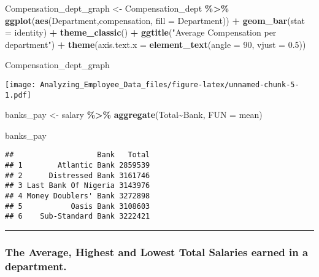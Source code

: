 \documentclass[
]{article}
\newenvironment{Shaded}{\begin{snugshade}}{\end{snugshade}}
\newcommand{\AttributeTok}[1]{\textcolor[rgb]{0.13,0.29,0.53}{#1}}
\newcommand{\DecValTok}[1]{\textcolor[rgb]{0.00,0.00,0.81}{#1}}
\newcommand{\FloatTok}[1]{\textcolor[rgb]{0.00,0.00,0.81}{#1}}
\newcommand{\FunctionTok}[1]{\textcolor[rgb]{0.13,0.29,0.53}{\textbf{#1}}}
\newcommand{\NormalTok}[1]{#1}
\newcommand{\OtherTok}[1]{\textcolor[rgb]{0.56,0.35,0.01}{#1}}
\newcommand{\SpecialCharTok}[1]{\textcolor[rgb]{0.81,0.36,0.00}{\textbf{#1}}}
\newcommand{\StringTok}[1]{\textcolor[rgb]{0.31,0.60,0.02}{#1}}
\begin{document}
\begin{Shaded}
\begin{Highlighting}[]
\NormalTok{Compensation\_dept\_graph }\OtherTok{\textless{}{-}}\NormalTok{ Compensation\_dept }\SpecialCharTok{\%\textgreater{}\%} \FunctionTok{ggplot}\NormalTok{(}\FunctionTok{aes}\NormalTok{(Department,compensation, }\AttributeTok{fill =}\NormalTok{ Department)) }\SpecialCharTok{+} \FunctionTok{geom\_bar}\NormalTok{(}\AttributeTok{stat =} \StringTok{\textquotesingle{}identity\textquotesingle{}}\NormalTok{)  }\SpecialCharTok{+} 
  \FunctionTok{theme\_classic}\NormalTok{() }\SpecialCharTok{+}  \FunctionTok{ggtitle}\NormalTok{(}\StringTok{"Average Compensation per department"}\NormalTok{) }\SpecialCharTok{+} \FunctionTok{theme}\NormalTok{(}\AttributeTok{axis.text.x =} \FunctionTok{element\_text}\NormalTok{(}\AttributeTok{angle =} \DecValTok{90}\NormalTok{, }\AttributeTok{vjust =} \FloatTok{0.5}\NormalTok{))}



\NormalTok{Compensation\_dept\_graph}
\end{Highlighting}
\end{Shaded}

\texttt{[image: Analyzing\_Employee\_Data\_files/figure-latex/unnamed-chunk-5-1.pdf]}

\begin{Shaded}
\begin{Highlighting}[]
\NormalTok{banks\_pay }\OtherTok{\textless{}{-}}\NormalTok{ salary }\SpecialCharTok{\%\textgreater{}\%} 
  \FunctionTok{aggregate}\NormalTok{(Total}\SpecialCharTok{\textasciitilde{}}\NormalTok{Bank,}
            \AttributeTok{FUN =} \StringTok{\textquotesingle{}mean\textquotesingle{}}\NormalTok{)}

\NormalTok{banks\_pay}
\end{Highlighting}
\end{Shaded}

\begin{verbatim}
##                   Bank   Total
## 1        Atlantic Bank 2859539
## 2      Distressed Bank 3161746
## 3 Last Bank Of Nigeria 3143976
## 4 Money Doublers' Bank 3272898
## 5           Oasis Bank 3108603
## 6    Sub-Standard Bank 3222421
\end{verbatim}

\begin{center}\rule{0.5\linewidth}{0.5pt}\end{center}

\subsubsection{The Average, Highest and Lowest Total Salaries earned in
a
department.}\label{the-average-highest-and-lowest-total-salaries-earned-in-a-department.}
\end{document}
